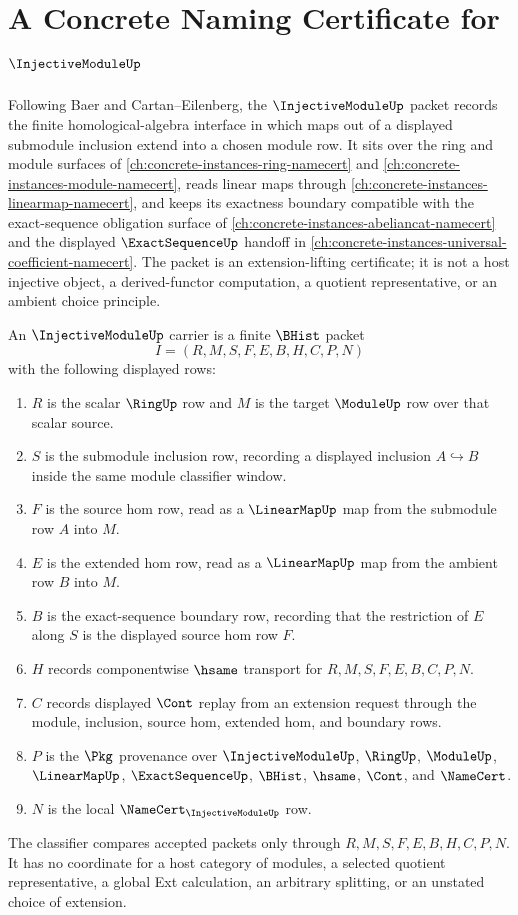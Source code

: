 \chapter{A Concrete Naming Certificate for $\InjectiveModuleUp$}
\label{ch:concrete-instances-injective-module-namecert}

Following Baer and Cartan--Eilenberg, the $\InjectiveModuleUp$ packet records the finite homological-algebra interface in which maps out of a displayed submodule inclusion extend into a chosen module row. It sits over the ring and module surfaces of \autoref{ch:concrete-instances-ring-namecert} and \autoref{ch:concrete-instances-module-namecert}, reads linear maps through \autoref{ch:concrete-instances-linearmap-namecert}, and keeps its exactness boundary compatible with the exact-sequence obligation surface of \autoref{ch:concrete-instances-abeliancat-namecert} and the displayed $\ExactSequenceUp$ handoff in \autoref{ch:concrete-instances-universal-coefficient-namecert}. The packet is an extension-lifting certificate; it is not a host injective object, a derived-functor computation, a quotient representative, or an ambient choice principle.

\begin{definition}
\label{def:injective-module-carrier}
An $\InjectiveModuleUp$ carrier is a finite $\BHist$ packet
$$
I=(R,M,S,F,E,B,H,C,P,N)
$$
with the following displayed rows:
\begin{enumerate}
\item $R$ is the scalar $\RingUp$ row and $M$ is the target $\ModuleUp$ row over that scalar source.
\item $S$ is the submodule inclusion row, recording a displayed inclusion $A\hookrightarrow B$ inside the same module classifier window.
\item $F$ is the source hom row, read as a $\LinearMapUp$ map from the submodule row $A$ into $M$.
\item $E$ is the extended hom row, read as a $\LinearMapUp$ map from the ambient row $B$ into $M$.
\item $B$ is the exact-sequence boundary row, recording that the restriction of $E$ along $S$ is the displayed source hom row $F$.
\item $H$ records componentwise $\hsame$ transport for $R,M,S,F,E,B,C,P,N$.
\item $C$ records displayed $\Cont$ replay from an extension request through the module, inclusion, source hom, extended hom, and boundary rows.
\item $P$ is the $\Pkg$ provenance over $\InjectiveModuleUp$, $\RingUp$, $\ModuleUp$, $\LinearMapUp$, $\ExactSequenceUp$, $\BHist$, $\hsame$, $\Cont$, and $\NameCert$.
\item $N$ is the local $\NameCert_{\InjectiveModuleUp}$ row.
\end{enumerate}
The classifier compares accepted packets only through $R,M,S,F,E,B,H,C,P,N$. It has no coordinate for a host category of modules, a selected quotient representative, a global Ext calculation, an arbitrary splitting, or an unstated choice of extension.
\end{definition}

